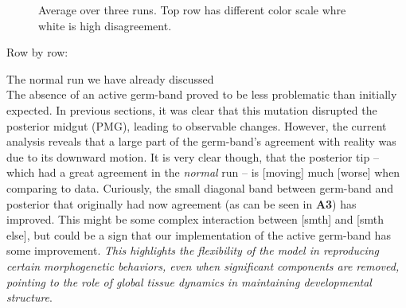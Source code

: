 \begin{figure}[H]
    \centering
    \caption{Average over three runs. Top row has different color scale whre white is high disagreement.}
    \label{fig:compare-motionAgreement-space}
\end{figure}



Row by row:

The normal run we have already discussed\\

The absence of an active germ-band proved to be less problematic than initially expected. In previous sections, it was clear that this mutation disrupted the posterior midgut (PMG), leading to observable changes. However, the current analysis reveals that a large part of the germ-band's agreement with reality was due to its downward motion. It is very clear though, that the posterior tip --  which had a great agreement in the \textit{normal} run -- is [moving] much [worse] when comparing to data. 
Curiously, the small diagonal band between germ-band and posterior that originally had now agreement (as can be seen in \textbf{A3}) has improved. This might be some complex interaction between [smth] and [smth else], but could be a sign that our implementation of the active germ-band has some improvement. 
\textit{This highlights the flexibility of the model in reproducing certain morphogenetic behaviors, even when significant components are removed, pointing to the role of global tissue dynamics in maintaining developmental structure}.\\

